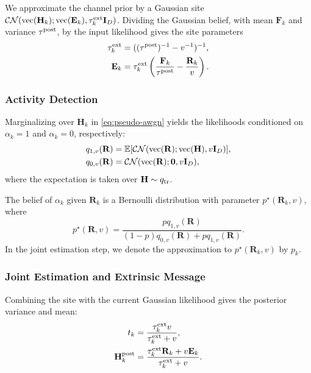 We approximate the channel prior by a Gaussian site
$\mathcal{CN}(\operatorname{vec}(\mathbf H_k);\operatorname{vec}(\mathbf E_k),\tau_k^{\rm ext}\mathbf{I}_D)$.
Dividing the Gaussian belief,
with mean $\mathbf F_k$ and variance $\tau^{\rm post}$, by the input
likelihood gives the site parameters
\begin{align}
 \tau_k^{\rm ext}&=((\tau^{\rm post})^{-1}-v^{-1})^{-1},
 \label{eq:site-update}\\
 \mathbf E_k&=\tau_k^{\rm ext}\left(\frac{\mathbf F_k}{\tau^{\rm post}}-\frac{\mathbf R_k}{v}\right).
 \label{eq:site-mean}
\end{align}

\subsubsection{Activity Detection}
\label{sec:activity-detection}

Marginalizing over $\mathbf H_k$ in \eqref{eq:pseudo-awgn} yields the
likelihoods conditioned on $\alpha_k=1$ and $\alpha_k=0$, respectively:
\begin{align}
 q_{1,v}(\mathbf R)&=\mathbb{E}[\mathcal{CN}(\operatorname{vec}(\mathbf R);\operatorname{vec}(\mathbf H),v\mathbf{I}_D)],
 \label{eq:query-densities}\\
 q_{0,v}(\mathbf R)&=\mathcal{CN}(\operatorname{vec}(\mathbf R);\mathbf0,v\mathbf{I}_D),
 \label{eq:inactive-density}
\end{align}
where the expectation is taken over $\mathbf H\sim q_{\rm tr}$.

The belief of $\alpha_k$ given $\mathbf R_k$ is a Bernoulli distribution
with parameter $p^\star(\mathbf R_k,v)$, where
\begin{equation}
 p^\star(\mathbf R,v)=\frac{p q_{1,v}(\mathbf R)}
 {(1-p)q_{0,v}(\mathbf R)+p q_{1,v}(\mathbf R)}.
 \label{eq:local-activity}
\end{equation}
In the joint estimation step, we denote the approximation to
$p^\star(\mathbf R_k,v)$ by $p_k$.

\subsubsection{Joint Estimation and Extrinsic Message}
\label{sec:joint-extrinsic}

Combining the site with the current Gaussian likelihood gives the
posterior variance and mean:
\begin{align}
 t_k&=\frac{\tau_k^{\rm ext}v}{\tau_k^{\rm ext}+v},
 \label{eq:conditional-moments}\\
 \mathbf H_k^{\rm post}&=\frac{\tau_k^{\rm ext}\mathbf R_k+v\mathbf E_k}{\tau_k^{\rm ext}+v}.
 \label{eq:conditional-channel-mean}
\end{align}

